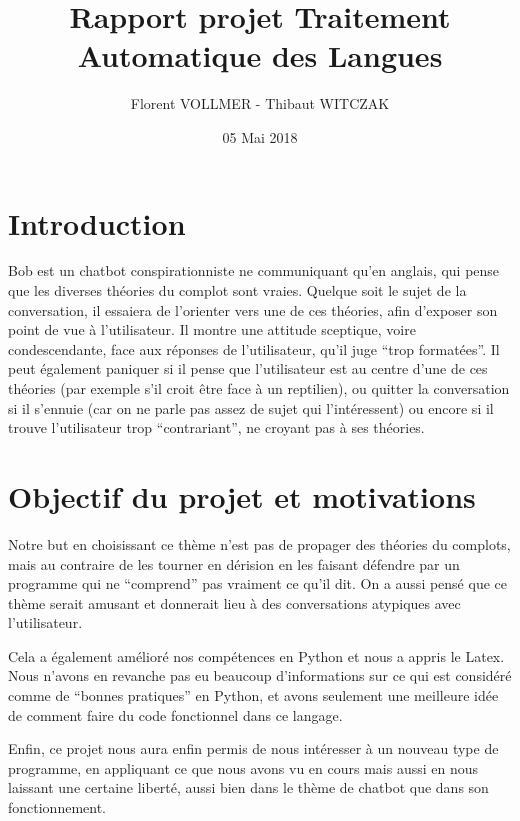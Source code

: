 \documentclass[paper=a4, 12pt]{report}
\begin{document}
\title{Rapport projet Traitement Automatique des Langues}
\author{Florent VOLLMER - Thibaut WITCZAK}
\date{05 Mai 2018}
\maketitle

\section{Introduction}
\vspace{0.5cm}
Bob est un chatbot conspirationniste ne communiquant qu’en anglais, qui pense que les diverses théories du complot sont vraies. Quelque soit le sujet de la conversation, il essaiera de l’orienter vers une de ces théories, afin d’exposer son point de vue à l’utilisateur. Il montre une attitude sceptique, voire condescendante, face aux réponses de l’utilisateur, qu’il juge “trop formatées”. Il peut également paniquer si il pense que l’utilisateur est au centre d’une de ces théories (par exemple s’il croit être face à un reptilien), ou quitter la conversation si il s’ennuie (car on ne parle pas assez de sujet qui l’intéressent) ou encore si il trouve l’utilisateur trop “contrariant”, ne croyant pas à ses théories.

\section{Objectif du projet et motivations}
\vspace{0.5cm}
Notre but en choisissant ce thème n’est pas de propager des théories du complots, mais au contraire de les tourner en dérision en les faisant défendre par un programme qui ne “comprend” pas vraiment ce qu’il dit. On a aussi pensé que ce thème serait amusant et donnerait lieu à des conversations atypiques avec l’utilisateur.

\vspace{0.5cm}

Cela a également amélioré nos compétences en Python et nous a appris le Latex. Nous n’avons en revanche pas eu beaucoup d’informations sur ce qui est considéré comme de “bonnes pratiques” en Python, et avons seulement une meilleure idée de comment faire du code fonctionnel dans ce langage.

\vspace{0.5cm}

Enfin, ce projet nous aura enfin permis de nous intéresser à un nouveau type de programme, en appliquant ce que nous avons vu en cours mais aussi en nous laissant une certaine liberté, aussi bien dans le thème de chatbot que dans son fonctionnement.
\end{document}
